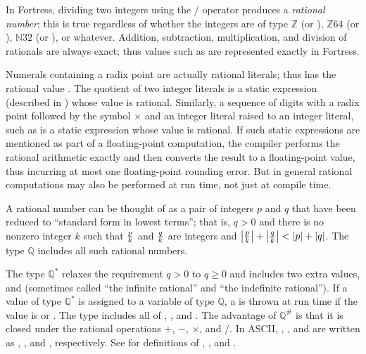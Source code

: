 In Fortress, dividing two integers using the $/$ operator produces
a \emph{rational number};
this is true regardless of whether
the integers are of type $\mathbb{Z}$ (or ),
$\mathbb{Z}64$ (or ), $\mathbb{N}32$ (or ), or
whatever.  Addition, subtraction, multiplication, and division of rationals
are always exact; thus values such as  are represented exactly in
Fortress.

Numerals containing a radix point are actually rational
literals; thus  has the rational value .
The quotient of two integer literals is a static expression
(described in ) whose value is rational.
Similarly, a sequence of digits with a radix point followed by the symbol
$\times$ and an integer literal raised to an integer literal,
such as 
is a static expression whose value is rational.
If such static expressions are mentioned as part of a floating-point
computation, the compiler performs the rational arithmetic exactly and then
converts the result to a floating-point value, thus incurring
at most one floating-point rounding error.
But in general rational computations may also be performed at run time,
not just at compile time.


A rational number can be thought of as a pair of integers $p$ and $q$
that have been reduced to ``standard form in lowest terms'';
that is, $q > 0$ and there is no nonzero integer $k$
such that $p \over k$ and $q \over k$ are integers
and $\left| {p \over k} \right| + \left| {q \over k} \right|
	< \left| p \right| + \left| q \right|$.
The type $\mathbb{Q}$ includes all such rational numbers.

The type $\mathbb{Q}^*$ relaxes the requirement $q>0$ to $q \geq 0$ and
includes two extra values,  and  (sometimes called ``the
infinite rational'' and ``the indefinite rational'').
If a value of type $\mathbb{Q}^*$ is assigned to a
variable of type $\mathbb{Q}$, a  is thrown
at run time if the value is  or .
The type  includes all of , , and
.
The advantage of $\mathbb{Q}^{\#}$ is that it is closed under the rational
operations $+$, $-$, $\times$, and $/$.
In ASCII, , , and
 are written as , , and
, respectively.
See  for definitions of , ,
and .




